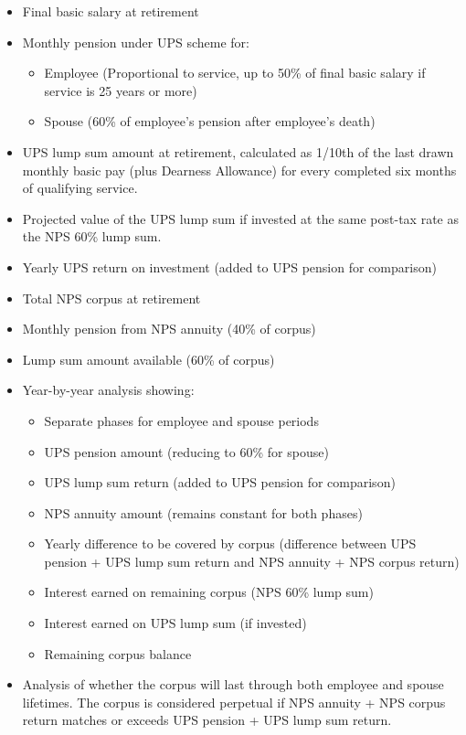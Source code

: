\documentclass{article}
\begin{document}
\begin{itemize}
    \item Final basic salary at retirement
    \item Monthly pension under UPS scheme for:
    \begin{itemize}
        \item Employee (Proportional to service, up to 50\% of final basic salary if service is 25 years or more)
        \item Spouse (60\% of employee's pension after employee's death)
    \end{itemize}
    \item UPS lump sum amount at retirement, calculated as 1/10th of the last drawn monthly basic pay (plus Dearness Allowance) for every completed six months of qualifying service.
    \item Projected value of the UPS lump sum if invested at the same post-tax rate as the NPS 60\% lump sum.
    \item Yearly UPS return on investment (added to UPS pension for comparison)
    \item Total NPS corpus at retirement
    \item Monthly pension from NPS annuity (40\% of corpus)
    \item Lump sum amount available (60\% of corpus)
    \item Year-by-year analysis showing:
    \begin{itemize}
        \item Separate phases for employee and spouse periods
        \item UPS pension amount (reducing to 60\% for spouse)
        \item UPS lump sum return (added to UPS pension for comparison)
        \item NPS annuity amount (remains constant for both phases)
        \item Yearly difference to be covered by corpus (difference between UPS pension + UPS lump sum return and NPS annuity + NPS corpus return)
        \item Interest earned on remaining corpus (NPS 60\% lump sum)
        \item Interest earned on UPS lump sum (if invested)
        \item Remaining corpus balance
    \end{itemize}
    \item Analysis of whether the corpus will last through both employee and spouse lifetimes. The corpus is considered perpetual if NPS annuity + NPS corpus return matches or exceeds UPS pension + UPS lump sum return.
\end{itemize}
\end{document}
